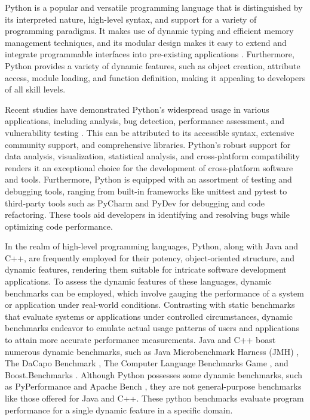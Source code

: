 Python is a popular and versatile programming language that is distinguished by its interpreted nature, high-level syntax, and support for a variety of programming paradigms.
It makes use of dynamic typing and efficient memory management techniques, and its modular design makes it easy to extend and integrate programmable interfaces into pre-existing applications \cite{Python_language_wiki}.
Furthermore, Python provides a variety of dynamic features, such as object creation, attribute access, module loading, and function definition, making it appealing to developers of all skill levels. 

Recent studies have demonstrated Python's widespread usage in various applications, including analysis, bug detection, performance assessment, and vulnerability testing \cite{Python_usage_study1, Python_usage_study2, Python_usage3}.
This can be attributed to its accessible syntax, extensive community support, and comprehensive libraries.
Python's robust support for data analysis, visualization, statistical analysis, and cross-platform compatibility renders it an exceptional choice for the development of cross-platform software and tools.
Furthermore, Python is equipped with an assortment of testing and debugging tools, ranging from built-in frameworks like unittest and pytest to third-party tools such as PyCharm \cite{PyCharm_2023} and PyDev \cite{PyDev_2023} for debugging and code refactoring.
These tools aid developers in identifying and resolving bugs while optimizing code performance.

In the realm of high-level programming languages, Python, along with Java and C++, are frequently employed for their potency, object-oriented structure, and dynamic features, rendering them suitable for intricate software development applications. 
To assess the dynamic features of these languages, dynamic benchmarks can be employed, which involve gauging the performance of a system or application under real-world conditions.
Contrasting with static benchmarks that evaluate systems or applications under controlled circumstances, dynamic benchmarks endeavor to emulate actual usage patterns of users and applications to attain more accurate performance measurements.
Java and C++ boast numerous dynamic benchmarks, such as Java Microbenchmark Harness (JMH) \cite{JMH}, The DaCapo Benchmark \cite{DaCapo_2006}, The Computer Language Benchmarks Game \cite{C++_Benchmark1}, and Boost.Benchmarks \cite{Boost_Benchmarks}.
Although Python possesses some dynamic benchmarks, such as PyPerformance \cite{PyPerformance} and Apache Bench \cite{Apache_Benchmark}, they are not general-purpose benchmarks like those offered for Java and C++.
These python benchmarks evaluate program performance for a single dynamic feature in a specific domain.

